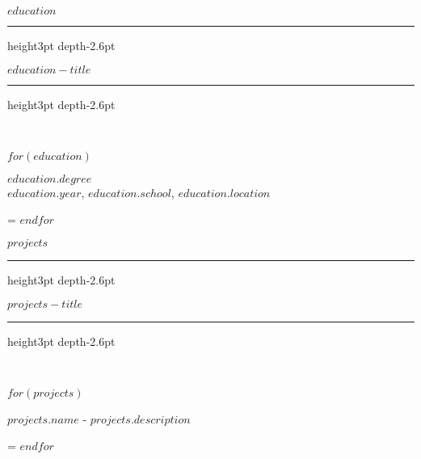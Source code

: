 \documentclass[11pt,a4paper]{article}
\newcommand{\spaceM} {\vspace{8pt}}
\newcommand{\borderBase}[1]{\textcolor{borderColor}{#1}}
\newcommand{\borderFill}{\borderBase{\leaders\hrule height3pt depth-2.6pt\hfill}}
\newcommand{\sectionTitle}[1]
{
  \begin{center}
    \borderFill {\scriptsize{ \textcolor{secondaryColor}{\uppercase{#1}} }}\borderFill \\
  \end{center}
}
\newcommand{\contentTitle}[1] {\MakeUppercase\normalsize\textbf{#1}}
\newcommand{\contentSubTitle}[1] {\normalsize\textcolor{secondaryColor}{#1}}
\newcommand{\content}[1] {\normalsize{#1}}
\newenvironment{absolutelynopagebreak}
  {\par\nobreak\vfil\penalty0\vfilneg
   \vtop\bgroup}
  {\par\xdef\tpd{\the\prevdepth}\egroup
   \prevdepth=\tpd}
\def \ifNotEmpty#1{\def\temp{#1} \ifx\temp\empty \else}
\begin{document}
\ifNotEmpty{$education$}
  \sectionTitle{$education-title$}

  $for(education)$
    \begin{absolutelynopagebreak}
      \contentTitle{$education.degree$} \\
      \contentSubTitle{$education.year$, $education.school$, $education.location$}

      \spaceM
    \end{absolutelynopagebreak}
  $endfor$
\fi

\ifNotEmpty{$projects$}
  \sectionTitle{$projects-title$}

  $for(projects)$
    \begin{absolutelynopagebreak}
      \contentTitle{$projects.name$} - \content{$projects.description$}\\

      \vspace{-8pt}
    \end{absolutelynopagebreak}
  $endfor$
\fi
\end{document}
